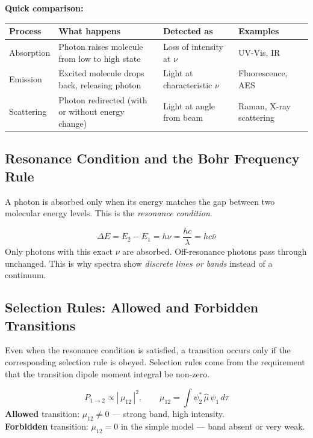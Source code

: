 \documentclass[12pt,a4paper]{article}
\begin{document}
\textbf{Quick comparison:}\par\noindent
\begin{tabularx}{\linewidth}{|B{2.6cm}|Y|Y|Y|}
\hline
\textbf{Process} & \textbf{What happens} & \textbf{Detected as} & \textbf{Examples} \\
\hline
Absorption & Photon raises molecule from low to high state & Loss of intensity at $\nu$ & UV-Vis, IR \\
\hline
Emission & Excited molecule drops back, releasing photon & Light at characteristic $\nu$ & Fluorescence, AES \\
\hline
Scattering & Photon redirected (with or without energy change) & Light at angle from beam & Raman, X-ray scattering \\
\hline
\end{tabularx}

\subsection{Resonance Condition and the Bohr Frequency Rule}
A photon is absorbed only when its energy matches the gap between two molecular energy levels. This is the \emph{resonance condition}.

\begin{tcolorbox}[formulabox, title={Bohr Frequency Condition}]
\[
\Delta E = E_2 - E_1 = h\nu = \frac{hc}{\lambda} = hc\bar{\nu}
\]
Only photons with this exact $\nu$ are absorbed. Off-resonance photons pass through unchanged. This is why spectra show \emph{discrete lines or bands} instead of a continuum.
\end{tcolorbox}

\subsection{Selection Rules: Allowed and Forbidden Transitions}
Even when the resonance condition is satisfied, a transition occurs only if the corresponding selection rule is obeyed. Selection rules come from the requirement that the transition dipole moment integral be non-zero.

\begin{tcolorbox}[formulabox, title={Transition Probability and Dipole Moment}]
\[
P_{1\to2} \propto |\,\mu_{12}\,|^{2}, \qquad
\mu_{12}=\int \psi_2^{*}\,\hat{\mu}\,\psi_1\,d\tau
\]
\textbf{Allowed} transition: $\mu_{12}\neq 0$ — strong band, high intensity.\\
\textbf{Forbidden} transition: $\mu_{12}=0$ in the simple model — band absent or very weak.
\end{tcolorbox}
\end{document}
